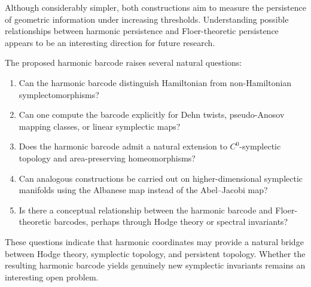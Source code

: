 \documentclass[11pt]{article}
\theoremstyle{definition}
\begin{document}
	Although considerably simpler, both constructions aim to measure the persistence
	of geometric information under increasing thresholds. Understanding possible
	relationships between harmonic persistence and Floer-theoretic persistence
	appears to be an interesting direction for future research.
	
	The proposed harmonic barcode raises several natural questions:
	
	\begin{enumerate}
		\item Can the harmonic barcode distinguish Hamiltonian from non-Hamiltonian
		symplectomorphisms?
		
		\item Can one compute the barcode explicitly for Dehn twists, pseudo-Anosov
		mapping classes, or linear symplectic maps?
		
		\item Does the harmonic barcode admit a natural extension to $C^0$-symplectic
		topology and area-preserving homeomorphisms?
		
		\item Can analogous constructions be carried out on higher-dimensional
		symplectic manifolds using the Albanese map instead of the Abel--Jacobi map?
		
		\item Is there a conceptual relationship between the harmonic barcode and
		Floer-theoretic barcodes, perhaps through Hodge theory or spectral invariants?
	\end{enumerate}
	
	These questions indicate that harmonic coordinates may provide a natural bridge
	between Hodge theory, symplectic topology, and persistent topology. Whether the
	resulting harmonic barcode yields genuinely new symplectic invariants remains an
	interesting open problem.
	
\end{document}
